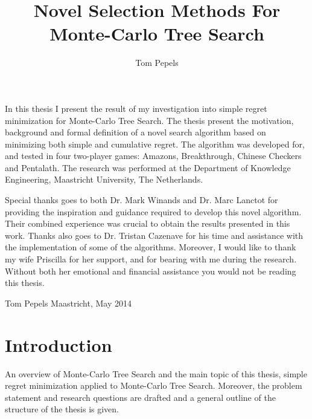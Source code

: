 \documentclass{kecsmstr}
\title{Novel Selection Methods For Monte-Carlo Tree Search}
\author{Tom Pepels}
\begin{document}
\makeheaders {} \maketitle \setcounter{page}{2}
\emptypage

In this thesis I present the result of my investigation into simple regret minimization for Monte-Carlo Tree Search. The thesis present the motivation, background and formal definition of a novel search algorithm based on minimizing both simple and cumulative regret. The algorithm was developed for, and tested in four two-player games: Amazons, Breakthrough, Chinese Checkers and Pentalath. The research was performed at the Department of Knowledge Engineering, Maastricht University, The Netherlands.

Special thanks goes to both Dr. Mark Winands and Dr. Marc Lanctot for providing the inspiration and guidance required to develop this novel algorithm. Their combined experience was crucial to obtain the results presented in this work. Thanks also goes to Dr. Tristan Cazenave for his time and assistance with the implementation of some of the algorithms. Moreover, I would like to thank my wife Priscilla for her support, and for  bearing with me during the research. Without both her emotional and financial assistance you would not be reading this thesis.
\newline \newline

\noindent Tom Pepels \newline
Maastricht, May 2014
\emptypage

 \emptypage

\tableofcontents  \emptypage 
\listofalgorithms \emptypage
{}

\chapter{Introduction}

\begin{chaptercontents} An overview of Monte-Carlo Tree Search and the main topic of this thesis, simple regret minimization applied to Monte-Carlo Tree Search. Moreover, the problem statement and research questions are drafted and a general outline of the structure of the thesis is given.
\end{chaptercontents}
\end{document}
